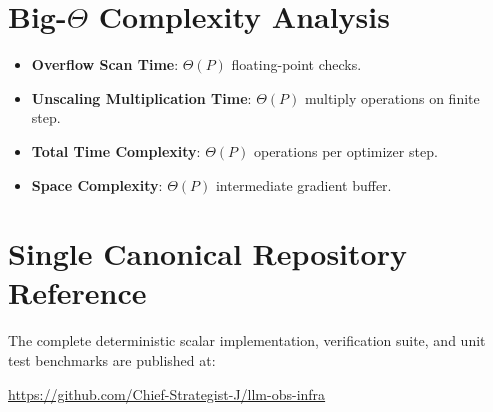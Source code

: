\documentclass[11pt,a4paper]{article}
\theoremstyle{definition}
\begin{document}
\section{Big-$\Theta$ Complexity Analysis}

\begin{itemize}
    \item \textbf{Overflow Scan Time}: $\Theta(P)$ floating-point checks.
    \item \textbf{Unscaling Multiplication Time}: $\Theta(P)$ multiply operations on finite step.
    \item \textbf{Total Time Complexity}: $\Theta(P)$ operations per optimizer step.
    \item \textbf{Space Complexity}: $\Theta(P)$ intermediate gradient buffer.
\end{itemize}

\section{Single Canonical Repository Reference}

The complete deterministic scalar implementation, verification suite, and unit test benchmarks are published at:
\begin{center}
\url{https://github.com/Chief-Strategist-J/llm-obs-infra}
\end{center}
\end{document}
